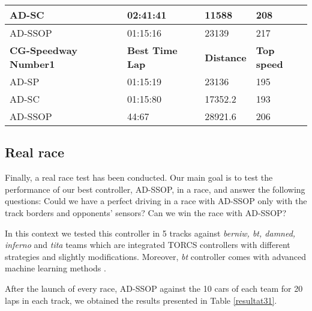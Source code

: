 \documentclass[runningheads,a4paper]{llncs}
\begin{document}
\begin{table}
{\begin{tabular}{ |p{3.5cm}|p{3cm}|p{3cm}|p{2.5cm}|}
				\\
				\hline
				AD-SC & 02:41:41  & 11588 & 208 
				\\
				\hline 
				AD-SSOP & 01:15:16 & 23139 & 217
				\\
				\hline 
				\hline
				{ \color{blue}\textbf{CG-Speedway Number1} }&
				{ \color{red}\textbf{Best Time Lap} }&
				{ \color{red} \textbf{Distance} } &
				{ \color{red} \textbf{Top speed} }
				\\
				\hline
				AD-SP & 01:15:19 & 23136 &  195
				\\
				\hline
				AD-SC & 01:15:80 & 17352.2 & 193 
				\\
				\hline 
				AD-SSOP & 44:67& 28921.6 &206 
				\\
				\hline 
				
			\end{tabular}
		}
	\end{table}
	
	
	\subsection{Real race}
	
	Finally, a real race test has been conducted. Our main goal is to test the performance of our best controller, AD-SSOP, in a race, and answer the following questions: Could we have a perfect driving in a race with AD-SSOP only with the track borders and opponents' sensors? Can we win the race with AD-SSOP?
	
	In this context we tested this controller in 5 tracks against \textit{berniw, bt, damned, inferno} and \textit{tita} teams which are integrated TORCS controllers with different strategies and slightly modifications. Moreover, \textit{bt} controller comes with advanced machine learning methods \cite{oponnents2010}.
	
	
	After the launch of every race, AD-SSOP against the 10 cars of each team for 20 laps in each track, we obtained the results presented in Table \ref{resultat31}.
	
\end{document}
